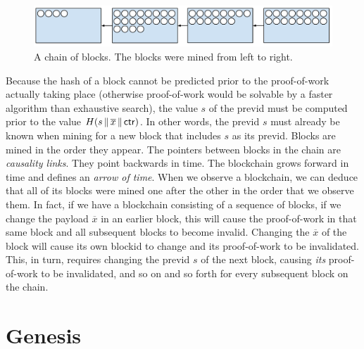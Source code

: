 \begin{figure}[h]
    \centering
    \includegraphics[width=1 \columnwidth,keepaspectratio]{figures/the-chain.pdf}
    \caption{A chain of blocks. The blocks were mined from left to right.}
    \label{fig.chain}
\end{figure}

Because the hash
of a block cannot be predicted prior to the proof-of-work actually taking place (otherwise
proof-of-work would be solvable by a faster algorithm than exhaustive search), the value
$s$ of the previd must be computed prior to the value $H(s \,\|\, \overline{x} \,\|\, \mathsf{ctr})$.
In other words, the previd $s$ must already be known when mining for a new block that includes
$s$ as its previd. Blocks are mined in the order they appear. The pointers between blocks
in the chain are \emph{causality links}. They point backwards in time. The blockchain grows
forward in time and defines an \emph{arrow of time}. When we observe a blockchain, we can
deduce that all of its blocks were mined one after the other in the order that we observe
them. In fact, if we have a blockchain consisting of a sequence of blocks, if we change
the payload $\overline{x}$ in an earlier block, this will cause the proof-of-work in that
same block and all subsequent blocks to become invalid. Changing the $\overline{x}$ of the
block will cause its own blockid to change and its proof-of-work to be invalidated. This, in
turn, requires changing the previd $s$ of the next block, causing \emph{its} proof-of-work to
be invalidated, and so on and so forth for every subsequent block on the chain.


\section{Genesis}

